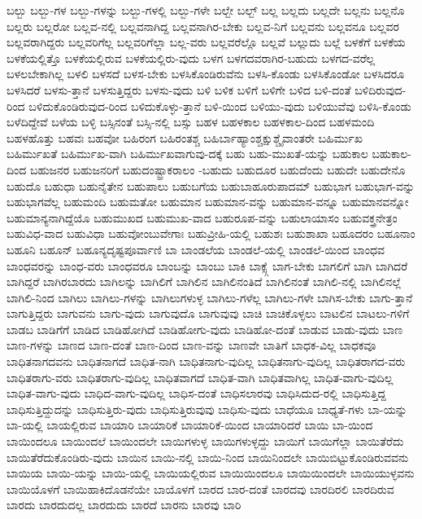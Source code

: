 {ಬಲ್ಬು
ಬಲ್ಬು-ಗಳ
ಬಲ್ಬು-ಗಳನ್ನು
ಬಲ್ಬು-ಗಳಲ್ಲಿ
ಬಲ್ಬು-ಗಳೇ
ಬಲ್ಬೇ
ಬಲ್ಬ್
ಬಲ್ಲ
ಬಲ್ಲದು
ಬಲ್ಲದೇ
ಬಲ್ಲನು
ಬಲ್ಲನೊ
ಬಲ್ಲರು
ಬಲ್ಲರೋ
ಬಲ್ಲವ-ನಲ್ಲಿ
ಬಲ್ಲವನಾಗಿದ್ದ
ಬಲ್ಲವನಾಗಿರ-ಬೇಕು
ಬಲ್ಲವ-ನಿಗೆ
ಬಲ್ಲವನು
ಬಲ್ಲವನೂ
ಬಲ್ಲವರ
ಬಲ್ಲವರಾಗಿದ್ದರು
ಬಲ್ಲವರಿಗೆಲ್ಲ
ಬಲ್ಲವರಿಗೆಲ್ಲಾ
ಬಲ್ಲ-ವರು
ಬಲ್ಲವರೆಲ್ಲೊ
ಬಲ್ಲವೆ
ಬಲ್ಲುದು
ಬಲ್ಲೆ
ಬಳಕೆಗೆ
ಬಳಕೆಯ
ಬಳಕೆಯಲ್ಲಿತ್ತೊ
ಬಳಕೆಯಲ್ಲಿರುವ
ಬಳಕೆಯಲ್ಲಿರು-ವುದು
ಬಳಗ
ಬಳಗದವರಾಗಿರ-ಬಹುದು
ಬಳಗದ-ವರೆಲ್ಲ
ಬಳಲಬೇಕಾಗಿಲ್ಲ
ಬಳಲಿ
ಬಳಸದೆ
ಬಳಸ-ಬೇಕು
ಬಳಸಿಕೊಂಡಿರುವೆನು
ಬಳಸಿ-ಕೊಂಡು
ಬಳಸಿಕೊಂಡೋ
ಬಳಸಿದರೂ
ಬಳಸಿದರೆ
ಬಳಸು-ತ್ತಾನೆ
ಬಳಸುತ್ತಿದ್ದರು
ಬಳಸು-ವುದು
ಬಳಿ
ಬಳಿಕ
ಬಳಿಗೆ
ಬಳಿಗೇ
ಬಳಿದ
ಬಳಿ-ದಂತೆ
ಬಳಿದಿರುವುದ-ರಿಂದ
ಬಳಿದುಕೊಂಡಿರುವುದ-ರಿಂದ
ಬಳಿದುಕೊಳ್ಳು-ತ್ತಾನೆ
ಬಳಿ-ಯಿಂದ
ಬಳಿಯು-ವುದು
ಬಳಿಯುವೆವು
ಬಳಿಸಿ-ಕೊಂಡು
ಬಳೆದಿದ್ದೇವೆ
ಬಳೆಯ
ಬಳ್ಳಿ
ಬಸ್ಸಿನಂತೆ
ಬಸ್ಸಿ-ನಲ್ಲಿ
ಬಸ್ಸು
ಬಹಳ
ಬಹಳಕಾಲ
ಬಹಳಕಾಲ-ದಿಂದ
ಬಹಳಮಂದಿ
ಬಹಳಹೊತ್ತು
ಬಹವಃ
ಬಹವೋ
ಬಹಿರಂಗ
ಬಹಿರಂತಶ್ಚ
ಬಹಿರ್ಬಾಹ್ಯಾಂಶ್ಚಕ್ಷುಶ್ಚೈವಾಂತರೇ
ಬಹಿರ್ಮುಖ
ಬಹಿರ್ಮುಖತೆ
ಬಹಿರ್ಮುಖ-ವಾಗಿ
ಬಹಿರ್ಮುಖವಾಗುವು-ದಕ್ಕೆ
ಬಹು
ಬಹು-ಮುಖತೆ-ಯನ್ನು
ಬಹುಕಾಲ
ಬಹುಕಾಲ-ದಿಂದ
ಬಹುಜನರ
ಬಹುಜನರಿಗೆ
ಬಹುದಂಷ್ಟ್ರಾಕರಾಲಂ
-ಬಹುದು
ಬಹುದೂರ
ಬಹುದೆಂದು
ಬಹುದೇ
ಬಹುದೇನೊ
ಬಹುದೊ
ಬಹುಧಾ
ಬಹುನೈತೇನ
ಬಹುಪಾಲು
ಬಹುಬಗೆಯ
ಬಹುಬಾಹೂರುಪಾದಮ್
ಬಹುಭಾಗ
ಬಹುಭಾಗ-ವನ್ನು
ಬಹುಭಾಗವೆಲ್ಲ
ಬಹುಮಂದಿ
ಬಹುಮತೋ
ಬಹುಮಾನ
ಬಹುಮಾನ-ವನ್ನು
ಬಹುಮಾನ-ವನ್ನೂ
ಬಹುಮಾನವನ್ನೋ
ಬಹುಮಾನ್ಯನಾಗಿದ್ದೆಯೊ
ಬಹುಮುಖದ
ಬಹುಮುಖ-ವಾದ
ಬಹುರೂಪ-ವನ್ನು
ಬಹುಲಾಯಾಸಂ
ಬಹುವಕ್ತ್ರನೇತ್ರಂ
ಬಹುವಿಧ-ವಾದ
ಬಹುವಿಧಾ
ಬಹುವೋಂಬುವೇಗಾಃ
ಬಹುವ್ರೀಹಿ-ಯಲ್ಲಿ
ಬಹುಶಃ
ಬಹುಶಾಖಾ
ಬಹೂದರಂ
ಬಹೂನಾಂ
ಬಹೂನಿ
ಬಹೂನ್
ಬಹೂನ್ಯದೃಷ್ಟಪೂರ್ವಾಣಿ
ಬಾ
ಬಾಂಡಲೆಯ
ಬಾಂಡಲೆ-ಯಲ್ಲಿ
ಬಾಂಡಲೆ-ಯಿಂದ
ಬಾಂಧವ
ಬಾಂಧವರನ್ನು
ಬಾಂಧ-ವರು
ಬಾಂಧವರೂ
ಬಾಂಬನ್ನು
ಬಾಂಬು
ಬಾಕಿ
ಬಾಕ್ಸ್ಗೆ
ಬಾಗ-ಬೇಕು
ಬಾಗಲಿಗೆ
ಬಾಗಿ
ಬಾಗಿದರೆ
ಬಾಗಿದ್ದರೆ
ಬಾಗಿರಬಾರದು
ಬಾಗಿಲನ್ನು
ಬಾಗಿಲಿಗೆ
ಬಾಗಿಲಿನ
ಬಾಗಿಲಿನಂತಿದೆ
ಬಾಗಿಲಿನಂತೆ
ಬಾಗಿಲಿ-ನಲ್ಲಿ
ಬಾಗಿಲಿನಲ್ಲೆ
ಬಾಗಿಲಿ-ನಿಂದ
ಬಾಗಿಲು
ಬಾಗಿಲು-ಗಳನ್ನು
ಬಾಗಿಲುಗಳುಳ್ಳ
ಬಾಗಿಲು-ಗಳೆಲ್ಲ
ಬಾಗಿಲು-ಗಳೇ
ಬಾಗಿಸ-ಬೇಕು
ಬಾಗು-ತ್ತಾನೆ
ಬಾಗುತ್ತಿದ್ದರು
ಬಾಗುವನು
ಬಾಗು-ವುದು
ಬಾಗುವುದೊ
ಬಾಗುವುವು
ಬಾಚಿ
ಬಾಚಿಕೊಳ್ಳಲು
ಬಾಟಲಿನ
ಬಾಟಲು-ಗಳಿಗೆ
ಬಾಡಬ
ಬಾಡಿಗೆಗೆ
ಬಾಡಿದ
ಬಾಡಿಹೋಗಿದೆ
ಬಾಡಿಹೋಗು-ವುದು
ಬಾಡಿಹೋ-ದಂತೆ
ಬಾಡುವ
ಬಾಡು-ವುದು
ಬಾಣ
ಬಾಣ-ಗಳನ್ನು
ಬಾಣದ
ಬಾಣ-ದಂತೆ
ಬಾಣ-ದಿಂದ
ಬಾಣ-ವನ್ನು
ಬಾಣವೇ
ಬಾತಿಗೆ
ಬಾಧಕ-ವಿಲ್ಲ
ಬಾಧಕವೂ
ಬಾಧಿತನಾಗದವನು
ಬಾಧಿತನಾಗದೆ
ಬಾಧಿತ-ನಾಗಿ
ಬಾಧಿತನಾಗು-ವುದಿಲ್ಲ
ಬಾಧಿತನಾಗು-ವುದಿಲ್ಲ
ಬಾಧಿತರಾಗದ-ವರು
ಬಾಧಿತರಾಗು-ವರು
ಬಾಧಿತರಾಗು-ವುದಿಲ್ಲ
ಬಾಧಿತವಾಗದೆ
ಬಾಧಿತ-ವಾಗಿ
ಬಾಧಿತವಾಗಿಲ್ಲ
ಬಾಧಿತ-ವಾಗು-ವುದಿಲ್ಲ
ಬಾಧಿತ-ವಾಗು-ವುದು
ಬಾಧಿದ-ವಾಗು-ವುದಿಲ್ಲ
ಬಾಧಿಸ-ದಂತೆ
ಬಾಧಿಸಲಾರವು
ಬಾಧಿಸಿದುದ-ರಲ್ಲಿ
ಬಾಧಿಸುತ್ತಿದ್ದ
ಬಾಧಿಸುತ್ತಿದ್ದುದನ್ನು
ಬಾಧಿಸುತ್ತಿರು-ವುದು
ಬಾಧಿಸುತ್ತಿರುವುವು
ಬಾಧಿಸು-ವುದು
ಬಾಧೆಯೂ
ಬಾಧ್ಯತೆ-ಗಳು
ಬಾ-ಯನ್ನು
ಬಾ-ಯಲ್ಲಿ
ಬಾಯಲ್ಲಿರುವ
ಬಾಯಾರಿ
ಬಾಯಾರಿಕೆ
ಬಾಯಾರಿಕೆ-ಯಿಂದ
ಬಾಯಾರಿದರೆ
ಬಾಯಿ
ಬಾ-ಯಿಂದ
ಬಾಯಿಂದಲೂ
ಬಾಯಿಂದಲೆ
ಬಾಯಿಂದಲೇ
ಬಾಯಿಗಳುಳ್ಳ
ಬಾಯಿಗಳುಳ್ಳದ್ದು
ಬಾಯಿಗೆ
ಬಾಯಿಗೆಲ್ಲಾ
ಬಾಯಿತೆರೆದು
ಬಾಯಿತೆರೆದುಕೊಂಡಿರು-ವುದು
ಬಾಯಿನ
ಬಾಯಿ-ನಲ್ಲಿ
ಬಾಯಿ-ನಿಂದ
ಬಾಯಿನಿಂದಲೇ
ಬಾಯಿಬಿಟ್ಟುಕೊಂಡಿರುವವನು
ಬಾಯಿಯ
ಬಾಯಿ-ಯನ್ನು
ಬಾಯಿ-ಯಲ್ಲಿ
ಬಾಯಿಯಲ್ಲಿರುವ
ಬಾಯಿಯಿಂದಲೂ
ಬಾಯಿಯಿಂದಲೇ
ಬಾಯಿಯುಳ್ಳವನು
ಬಾಯಿಯೊಳಗೆ
ಬಾಯಿಹಾಕಿದೊಡನೆಯೇ
ಬಾಯೊಳಗೆ
ಬಾರದ
ಬಾರ-ದಂತೆ
ಬಾರದವು
ಬಾರದಿರಲಿ
ಬಾರದಿರುವ
ಬಾರದು
ಬಾರದುದಲ್ಲ
ಬಾರದುದು
ಬಾರದೆ
ಬಾರನು
ಬಾರವು
ಬಾರಿ
}
